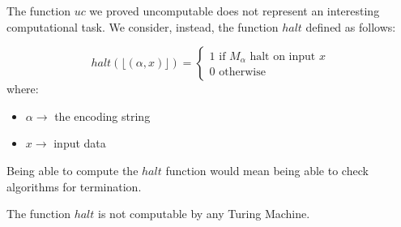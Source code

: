 The function $uc$ we proved uncomputable does not represent an interesting computational task. We consider, instead, the function $halt$ defined as follows:
\begin{definition}
    $$ halt(\lfloor (\alpha, x) \rfloor) = \begin{cases} 1 \text{ if } M_{\alpha} \text{ halt on input } x \\ 0 \text{ otherwise } \end{cases} $$
    where: 
    \begin{itemize}
        \renewcommand{\labelitemi}{-}
        \item $\alpha \rightarrow$ the encoding string
        \item $x \rightarrow$ input data
    \end{itemize}
\end{definition}
Being able to compute the $halt$ function would mean being able to check algorithms for termination.
\begin{definition}[title = Theorem]
    The function $halt$ is not computable by any Turing Machine.
\end{definition}